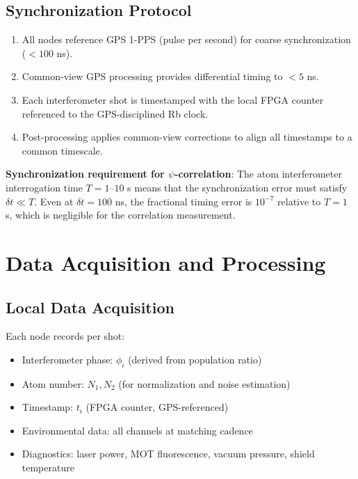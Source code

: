 \documentclass[12pt,a4paper]{article}
\begin{document}
\subsection{Synchronization Protocol}

\begin{enumerate}
\item All nodes reference GPS 1-PPS (pulse per second) for coarse
synchronization ($< 100$ ns).
\item Common-view GPS processing provides differential timing to $< 5$ ns.
\item Each interferometer shot is timestamped with the local FPGA counter
referenced to the GPS-disciplined Rb clock.
\item Post-processing applies common-view corrections to align all
timestamps to a common timescale.
\end{enumerate}

\textbf{Synchronization requirement for $\psi$-correlation}: The atom
interferometer interrogation time $T = 1$--$10$ s means that the
synchronization error must satisfy $\delta t \ll T$. Even at $\delta t
= 100$ ns, the fractional timing error is $10^{-7}$ relative to $T = 1$ s,
which is negligible for the correlation measurement.


\section{Data Acquisition and Processing}\label{sec:daq}

\subsection{Local Data Acquisition}

Each node records per shot:
\begin{itemize}
\item Interferometer phase: $\phi_i$ (derived from population ratio)
\item Atom number: $N_1, N_2$ (for normalization and noise estimation)
\item Timestamp: $t_i$ (FPGA counter, GPS-referenced)
\item Environmental data: all channels at matching cadence
\item Diagnostics: laser power, MOT fluorescence, vacuum pressure,
shield temperature
\end{itemize}
\end{document}
